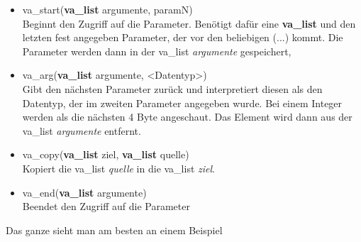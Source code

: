 \documentclass[c_worksheet.tex]{subfiles}
\begin{document}
\begin{itemize}
	\item va\_start(\textbf{va\_list} argumente, paramN) \\
	Beginnt den Zugriff auf die Parameter. Benötigt dafür eine \textbf{va\_list} und den letzten fest angegeben Parameter, der vor den beliebigen (...) kommt. Die Parameter werden dann in der va\_list \emph{argumente} gespeichert,
	\item va\_arg(\textbf{va\_list} argumente, <Datentyp>) \\
	Gibt den nächsten Parameter zurück und interpretiert diesen als den Datentyp, der im zweiten Parameter angegeben wurde. Bei einem Integer werden als die nächsten 4 Byte angeschaut. Das Element wird dann aus der va\_list \emph{argumente} entfernt.
	\item va\_copy(\textbf{va\_list} ziel, \textbf{va\_list} quelle) \\
	Kopiert die va\_list \emph{quelle} in die va\_list \emph{ziel}.
	\item va\_end(\textbf{va\_list} argumente) \\
	Beendet den Zugriff auf die Parameter
\end{itemize}

Das ganze sieht man am besten an einem Beispiel


\end{document}
